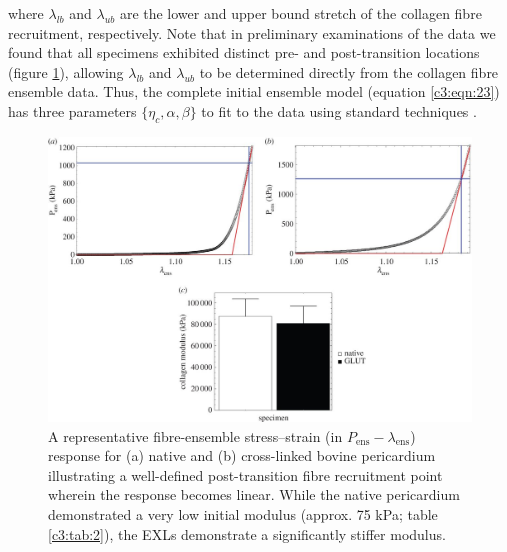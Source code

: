     where $\lambda_{lb}$ and $\lambda_{ub}$ are the lower and upper bound stretch of the collagen fibre recruitment, respectively. Note that in preliminary examinations of the data we found that all specimens exhibited distinct pre- and post-transition locations (figure \ref{c3:fig:5}), allowing $\lambda_{lb}$ and $\lambda_{ub}$ to be determined directly from the collagen fibre ensemble data. Thus, the complete initial ensemble model (equation \ref{c3:eqn:23}) has three parameters $\{\eta_c, \alpha, \beta\}$ to fit to the data using standard techniques \cite{fata_insights_2014}.
    
    
    
    
    
\begin{figure}
\centering
\includegraphics[width=\textwidth]{Images/chapter3/F5large.jpg}
\caption{A representative fibre-ensemble stress–strain (in $P_\mathrm{ens}-\lambda_\mathrm{ens}$) response for (a) native and (b) cross-linked bovine pericardium illustrating a well-defined post-transition fibre recruitment point wherein the response becomes linear. While the native pericardium demonstrated a very low initial modulus (approx. 75 kPa; table \ref{c3:tab:2}), the EXLs demonstrate a significantly stiffer modulus.}
\label{c3:fig:5}
\end{figure}
